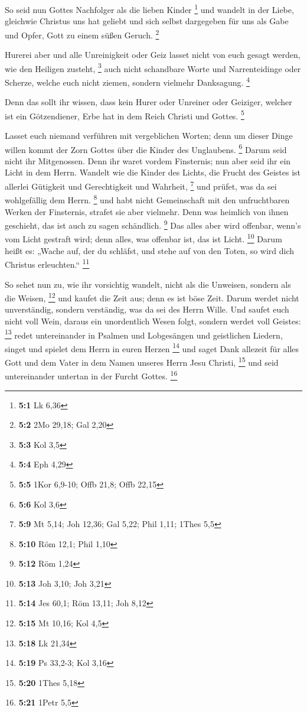  So seid nun Gottes Nachfolger als die lieben Kinder
\footnote{\textbf{5:1} Lk 6,36}  und wandelt in der Liebe,
gleichwie Christus uns hat geliebt und sich selbst dargegeben für uns
als Gabe und Opfer, Gott zu einem süßen Geruch. \footnote{\textbf{5:2}
  2Mo 29,18; Gal 2,20}

 Hurerei aber und alle Unreinigkeit oder Geiz lasset nicht
von euch gesagt werden, wie den Heiligen zusteht, \footnote{\textbf{5:3}
  Kol 3,5}  auch nicht schandbare Worte und Narrenteidinge
oder Scherze, welche euch nicht ziemen, sondern vielmehr Danksagung.
\footnote{\textbf{5:4} Eph 4,29}

 Denn das sollt ihr wissen, dass kein Hurer oder Unreiner
oder Geiziger, welcher ist ein Götzendiener, Erbe hat in dem Reich
Christi und Gottes. \footnote{\textbf{5:5} 1Kor 6,9-10; Offb 21,8; Offb
  22,15}

 Lasset euch niemand verführen mit vergeblichen Worten; denn
um dieser Dinge willen kommt der Zorn Gottes über die Kinder des
Unglaubens. \footnote{\textbf{5:6} Kol 3,6}  Darum seid
nicht ihr Mitgenossen.  Denn ihr waret vordem Finsternis;
nun aber seid ihr ein Licht in dem Herrn.  Wandelt wie die
Kinder des Lichts, die Frucht des Geistes ist allerlei Gütigkeit und
Gerechtigkeit und Wahrheit, \footnote{\textbf{5:9} Mt 5,14; Joh 12,36;
  Gal 5,22; Phil 1,11; 1Thes 5,5}  und prüfet, was da sei
wohlgefällig dem Herrn. \footnote{\textbf{5:10} Röm 12,1; Phil 1,10}
 und habt nicht Gemeinschaft mit den unfruchtbaren Werken
der Finsternis, strafet sie aber vielmehr.  Denn was
heimlich von ihnen geschieht, das ist auch zu sagen schändlich.
\footnote{\textbf{5:12} Röm 1,24}  Das alles aber wird
offenbar, wenn's vom Licht gestraft wird; denn alles, was offenbar ist,
das ist Licht. \footnote{\textbf{5:13} Joh 3,10; Joh 3,21} 
Darum heißt es: „Wache auf, der du schläfst, und stehe auf von den
Toten, so wird dich Christus erleuchten.`` \footnote{\textbf{5:14} Jes
  60,1; Röm 13,11; Joh 8,12}

 So sehet nun zu, wie ihr vorsichtig wandelt, nicht als die
Unweisen, sondern als die Weisen, \footnote{\textbf{5:15} Mt 10,16; Kol
  4,5}  und kaufet die Zeit aus; denn es ist böse Zeit.
 Darum werdet nicht unverständig, sondern verständig, was
da sei des Herrn Wille.  Und saufet euch nicht voll Wein,
daraus ein unordentlich Wesen folgt, sondern werdet voll Geistes:
\footnote{\textbf{5:18} Lk 21,34}  redet untereinander in
Psalmen und Lobgesängen und geistlichen Liedern, singet und spielet dem
Herrn in euren Herzen \footnote{\textbf{5:19} Ps 33,2-3; Kol 3,16}
 und saget Dank allezeit für alles Gott und dem Vater in
dem Namen unseres Herrn Jesu Christi, \footnote{\textbf{5:20} 1Thes 5,18}
 und seid untereinander untertan in der Furcht Gottes.
\footnote{\textbf{5:21} 1Petr 5,5}

